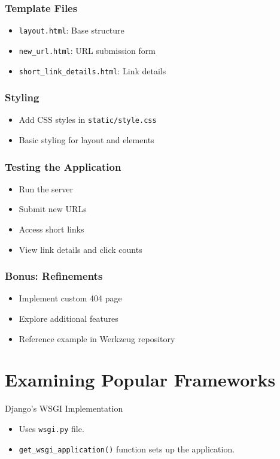 \documentclass{beamer}
\begin{document}
\begin{frame}
\frametitle{Template Files}
\begin{itemize}
    \item \texttt{layout.html}: Base structure
    \item \texttt{new\_url.html}: URL submission form
    \item \texttt{short\_link\_details.html}: Link details
\end{itemize}
\end{frame}

\begin{frame}
\frametitle{Styling}
\begin{itemize}
    \item Add CSS styles in \texttt{static/style.css}
    \item Basic styling for layout and elements
\end{itemize}
\end{frame}

\begin{frame}
\frametitle{Testing the Application}
\begin{itemize}
    \item Run the server
    \item Submit new URLs
    \item Access short links
    \item View link details and click counts
\end{itemize}
\end{frame}
\begin{frame}
\frametitle{Bonus: Refinements}
\begin{itemize}
    \item Implement custom 404 page
    \item Explore additional features
    \item Reference example in Werkzeug repository
\end{itemize}
\end{frame}
\section{Examining Popular Frameworks}

\begin{frame}{Django's WSGI Implementation}
    \begin{itemize}
        \item Uses \texttt{wsgi.py} file.
        \item \texttt{get\_wsgi\_application()} function sets up the application.
    \end{itemize}
\end{frame}
\end{document}
